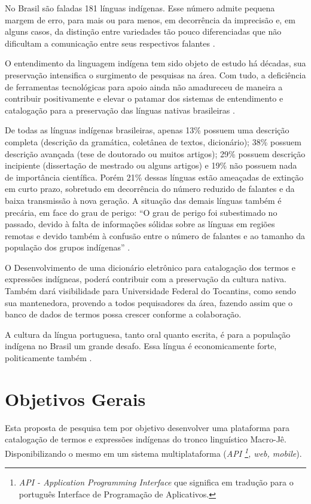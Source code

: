 \documentclass[journal]{IEEEtran}
\begin{document}
No Brasil são faladas 181 línguas indígenas. Esse número admite pequena margem de erro, para mais ou para menos, em decorrência da imprecisão e, em alguns casos, da distinção entre variedades tão pouco diferenciadas que não dificultam a comunicação entre seus respectivos falantes \cite{silvaterene2013}.

O entendimento da linguagem indígena tem sido objeto de estudo há décadas, sua preservação intensifica o surgimento de pesquisas na área. Com tudo, a deficiência de ferramentas tecnológicas para apoio ainda não amadureceu de maneira a contribuir positivamente e elevar o patamar dos sistemas de entendimento e catalogação para a preservação das línguas nativas brasileiras \cite{abreu2013dicionario}.

De todas as línguas indígenas brasileiras, apenas 13\% possuem uma descrição completa (descrição da gramática, coletânea de textos, dicionário); 38\% possuem descrição avançada (tese de doutorado ou muitos artigos); 29\% possuem descrição incipiente (dissertação de mestrado ou alguns artigos) e 19\% não possuem nada de importância científica. Porém 21\% dessas línguas estão ameaçadas de extinção em curto prazo, sobretudo em decorrência do número reduzido de falantes e da baixa transmissão à nova geração. A situação das demais línguas também é precária, em face do grau de perigo: “O grau de perigo foi subestimado no passado, devido à falta de informações sólidas sobre as línguas em regiões remotas e devido também à confusão entre o número de falantes e ao tamanho da população dos grupos indígenas” \cite{moore2008}.

O Desenvolvimento de uma dicionário eletrônico para catalogação dos termos e expressões indígneas, poderá contribuir com a preservação da cultura nativa. Também dará visibilidade para Universidade Federal do Tocantins, como sendo sua mantenedora, provendo a todos pequisadores da área, fazendo assim que o banco de dados de termos possa crescer conforme a colaboração.

A cultura da língua portuguesa, tanto oral quanto escrita, é para a população indígena no Brasil um grande desafo. Essa língua é economicamente forte, politicamente também \cite{eduardo2018}.

\section{Objetivos Gerais}

Esta proposta de pesquisa tem por objetivo desenvolver uma plataforma para catalogação de termos e expressões indígenas do tronco linguístico Macro-Jê. Disponibilizando o mesmo em um sistema multiplataforma ({\it API \footnote{{\it API - Application Programming Interface} que significa em tradução para o português Interface de Programação de Aplicativos.}, web, mobile}).
\end{document}
